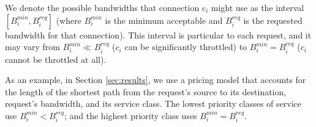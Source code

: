 \documentclass[journal]{IEEEtran}
\begin{document}
We denote the possible bandwidths that connection $c_i$ might use as the interval $[B_i^{min}, B_i^{req}]$ (where $B_i^{min}$ is the minimum acceptable and $B_i^{req}$ is the requested bandwidth for that connection). This interval is particular to each request, and it may vary from $B_i^{min} \ll B_i^{req}$ ($c_i$ can be significantly throttled) to $B_i^{min} = B_i^{req}$ ($c_i$ cannot be throttled at all). 

As an example, in Section \ref{sec:results}, we use a pricing model that accounts for the length of the shortest path from the request's source to its destination, request's bandwidth, and its service class. The lowest priority classes of service use $B_i^{min} < B_i^{req}$; and the highest priority class uses $B_i^{min} = B_i^{req}$. %




\end{document}
